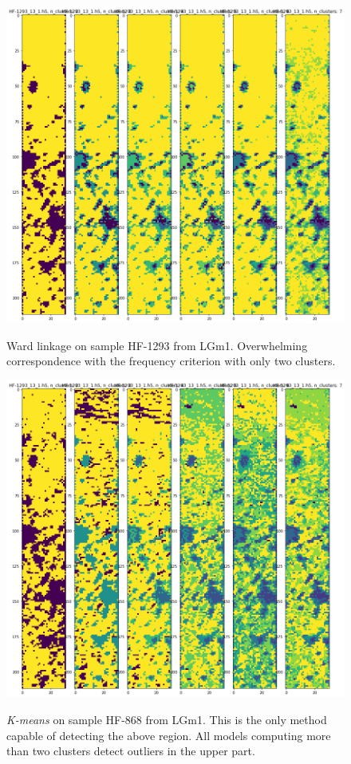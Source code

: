 \documentclass[a4paper, 12pt, oneside]{book}
\begin{document}
\begin{appendices}
\begin{figure}[H]
\end{figure}

\begin{figure}[H]

    \centering
{\includegraphics[width=15cm]{images/Ward_linkage/LGm-1/HF-1293_13_1.h5_1.png} }
\caption{Ward linkage on sample HF-1293 from LGm1. Overwhelming correspondence with the frequency criterion with only two clusters. \label{fig:SL_HF868}}%

\end{figure}

\begin{figure}[H]

    \centering
{\includegraphics[width=15cm]{images/KMeans_full/LGm-1/HF-1293_13_1.h5_1.png} }
\caption{\textit{K-means} on sample HF-868 from LGm1. This is the only method capable of detecting the above region. All models computing more than two clusters detect outliers in the upper part.  \label{fig:SL_HF868}}%


\end{figure}
\end{appendices}
\end{document}
